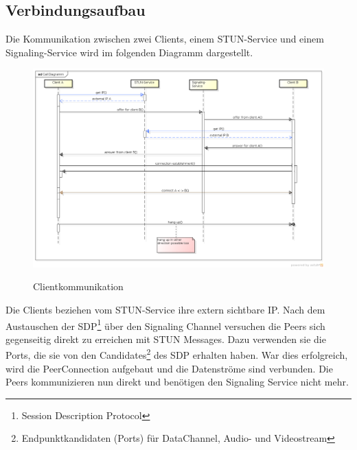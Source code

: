 	\subsection{Verbindungsaufbau}
		Die Kommunikation zwischen zwei Clients, einem STUN-Service und einem
		Signaling-Service wird im folgenden Diagramm dargestellt.
		\begin{figure}[H]
			\centering
			\includegraphics[width=\textwidth]{../architekturanalayse/img/callDiagramm.png}
			\label{img:deployment}
			\caption{Clientkommunikation}
		\end{figure}
		Die Clients beziehen vom STUN-Service ihre extern sichtbare IP. Nach dem
		Austauschen der SDP\footnote{Session Description Protocol\cite{IETF-SDP-RFC}}
		über den Signaling Channel versuchen die Peers sich gegenseitig direkt zu
		erreichen mit STUN Messages. Dazu verwenden sie die Ports, die sie von den
		Candidates\footnote{Endpunktkandidaten (Ports) für DataChannel, Audio- und Videostream} des SDP erhalten haben.
		War dies erfolgreich, wird die PeerConnection aufgebaut und die Datenströme
		sind verbunden. Die Peers kommunizieren nun direkt und benötigen den
		Sig\-naling Service nicht mehr.
				
